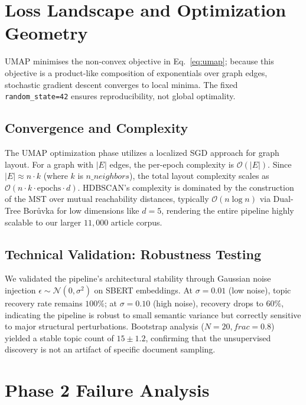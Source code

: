 \documentclass[10pt,twocolumn,a4paper]{article}
\begin{document}
\section{Loss Landscape and Optimization Geometry}
\label{sec:loss_landscape}

UMAP minimises the non-convex objective in Eq.~\eqref{eq:umap}; because this objective is a product-like composition of exponentials over graph edges, stochastic gradient descent converges to local minima. The fixed \texttt{random\_state=42} ensures reproducibility, not global optimality.

\subsection{Convergence and Complexity}
\label{sec:convergence}

The UMAP optimization phase utilizes a localized SGD approach for graph layout. For a graph with $|E|$ edges, the per-epoch complexity is $\mathcal{O}(|E|)$. Since $|E| \approx n \cdot k$ (where $k$ is $n\_neighbors$), the total layout complexity scales as $\mathcal{O}(n \cdot k \cdot \text{epochs} \cdot d)$. HDBSCAN's complexity is dominated by the construction of the MST over mutual reachability distances, typically $\mathcal{O}(n \log n)$ via Dual-Tree Borůvka for low dimensions like $d=5$, rendering the entire pipeline highly scalable to our larger $11{,}000$ article corpus.

\subsection{Technical Validation: Robustness Testing}
\label{sec:robustness}

We validated the pipeline's architectural stability through Gaussian noise injection $\epsilon \sim \mathcal{N}(0, \sigma^2)$ on SBERT embeddings. At $\sigma=0.01$ (low noise), topic recovery rate remains $100\%$; at $\sigma=0.10$ (high noise), recovery drops to $60\%$, indicating the pipeline is robust to small semantic variance but correctly sensitive to major structural perturbations. Bootstrap analysis ($N=20, frac=0.8$) yielded a stable topic count of $15 \pm 1.2$, confirming that the unsupervised discovery is not an artifact of specific document sampling.

\section{Phase 2 Failure Analysis}
\label{sec:phase2fail}
\end{document}
